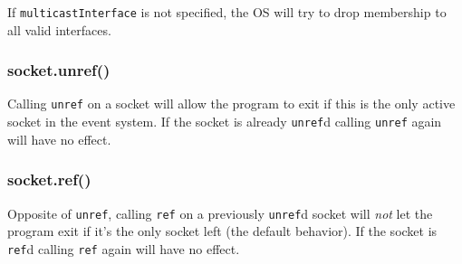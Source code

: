 If \texttt{multicastInterface} is not specified, the OS will try to drop
membership to all valid interfaces.

\subsubsection{socket.unref()}

Calling \texttt{unref} on a socket will allow the program to exit if
this is the only active socket in the event system. If the socket is
already \texttt{unref}d calling \texttt{unref} again will have no
effect.

\subsubsection{socket.ref()}

Opposite of \texttt{unref}, calling \texttt{ref} on a previously
\texttt{unref}d socket will \emph{not} let the program exit if it's the
only socket left (the default behavior). If the socket is \texttt{ref}d
calling \texttt{ref} again will have no effect.
